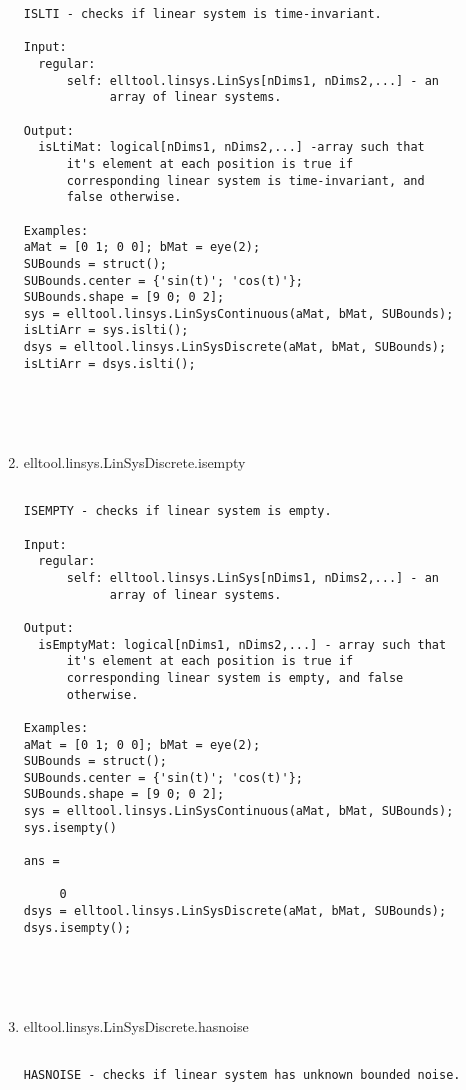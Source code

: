 \begin{enumerate}
\begin{lstlisting}
ISLTI - checks if linear system is time-invariant.

Input:
  regular:
      self: elltool.linsys.LinSys[nDims1, nDims2,...] - an
            array of linear systems.

Output:
  isLtiMat: logical[nDims1, nDims2,...] -array such that
      it's element at each position is true if
      corresponding linear system is time-invariant, and
      false otherwise.

Examples:
aMat = [0 1; 0 0]; bMat = eye(2);
SUBounds = struct();
SUBounds.center = {'sin(t)'; 'cos(t)'};
SUBounds.shape = [9 0; 0 2];
sys = elltool.linsys.LinSysContinuous(aMat, bMat, SUBounds);
isLtiArr = sys.islti();
dsys = elltool.linsys.LinSysDiscrete(aMat, bMat, SUBounds);
isLtiArr = dsys.islti();





\end{lstlisting}
\fontfamily{\familydefault}
\selectfont
\item {elltool.linsys.LinSysDiscrete.isempty}
\selectfont
\begin{lstlisting}

ISEMPTY - checks if linear system is empty.

Input:
  regular:
      self: elltool.linsys.LinSys[nDims1, nDims2,...] - an
            array of linear systems.

Output:
  isEmptyMat: logical[nDims1, nDims2,...] - array such that
      it's element at each position is true if
      corresponding linear system is empty, and false
      otherwise.

Examples:
aMat = [0 1; 0 0]; bMat = eye(2);
SUBounds = struct();
SUBounds.center = {'sin(t)'; 'cos(t)'};
SUBounds.shape = [9 0; 0 2];
sys = elltool.linsys.LinSysContinuous(aMat, bMat, SUBounds);
sys.isempty()

ans =

     0
dsys = elltool.linsys.LinSysDiscrete(aMat, bMat, SUBounds);
dsys.isempty();





\end{lstlisting}
\fontfamily{\familydefault}
\selectfont
\item {elltool.linsys.LinSysDiscrete.hasnoise}
\selectfont
\begin{lstlisting}

HASNOISE - checks if linear system has unknown bounded noise.


\end{lstlisting}
\end{enumerate}
